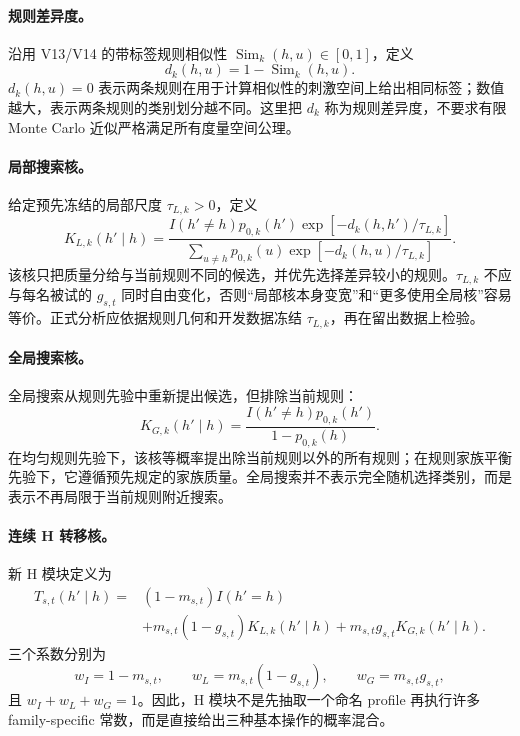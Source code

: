 \paragraph{规则差异度。}
沿用 V13/V14 的带标签规则相似性 $\operatorname{Sim}_k(h,u)\in[0,1]$，定义
\begin{equation}
    d_k(h,u)=1-\operatorname{Sim}_k(h,u).
    \label{eq:model0803-rule-distance}
\end{equation}
$d_k(h,u)=0$ 表示两条规则在用于计算相似性的刺激空间上给出相同标签；数值越大，表示两条规则的类别划分越不同。这里把 $d_k$ 称为规则差异度，不要求有限 Monte Carlo 近似严格满足所有度量空间公理。

\paragraph{局部搜索核。}
给定预先冻结的局部尺度 $\tau_{L,k}>0$，定义
\begin{equation}
    K_{L,k}(h'\mid h)
    =
    \frac{
      I(h'\neq h)p_{0,k}(h')
      \exp[-d_k(h,h')/\tau_{L,k}]
    }{
      \sum_{u\neq h}p_{0,k}(u)
      \exp[-d_k(h,u)/\tau_{L,k}]
    }.
    \label{eq:model0803-local-kernel}
\end{equation}
该核只把质量分给与当前规则不同的候选，并优先选择差异较小的规则。$\tau_{L,k}$ 不应与每名被试的 $g_{s,t}$ 同时自由变化，否则“局部核本身变宽”和“更多使用全局核”容易等价。正式分析应依据规则几何和开发数据冻结 $\tau_{L,k}$，再在留出数据上检验。

\paragraph{全局搜索核。}
全局搜索从规则先验中重新提出候选，但排除当前规则：
\begin{equation}
    K_{G,k}(h'\mid h)
    =
    \frac{I(h'\neq h)p_{0,k}(h')}
    {1-p_{0,k}(h)}.
    \label{eq:model0803-global-kernel}
\end{equation}
在均匀规则先验下，该核等概率提出除当前规则以外的所有规则；在规则家族平衡先验下，它遵循预先规定的家族质量。全局搜索并不表示完全随机选择类别，而是表示不再局限于当前规则附近搜索。

\paragraph{连续 H 转移核。}
新 H 模块定义为
\begin{align}
    T_{s,t}(h'\mid h)
    ={}&(1-m_{s,t})I(h'=h)\nonumber\\
    &+m_{s,t}(1-g_{s,t})K_{L,k}(h'\mid h)
    +m_{s,t}g_{s,t}K_{G,k}(h'\mid h).
    \label{eq:model0803-transition-kernel}
\end{align}
三个系数分别为
\begin{equation}
    w_I=1-m_{s,t},\qquad
    w_L=m_{s,t}(1-g_{s,t}),\qquad
    w_G=m_{s,t}g_{s,t},
    \label{eq:model0803-operation-weights}
\end{equation}
且 $w_I+w_L+w_G=1$。因此，H 模块不是先抽取一个命名 profile 再执行许多 family-specific 常数，而是直接给出三种基本操作的概率混合。

